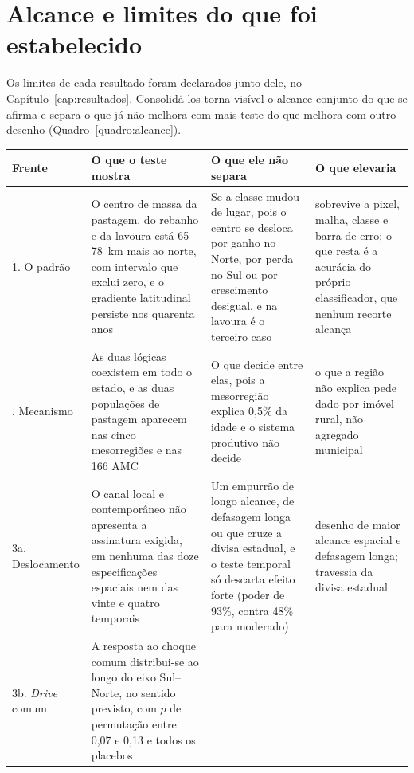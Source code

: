 \section{Alcance e limites do que foi estabelecido}
\label{sec:disc-limites}

Os limites de cada resultado foram declarados junto dele, no
Capítulo~\ref{cap:resultados}. Consolidá-los torna visível o alcance conjunto
do que se afirma e separa o que já não melhora com mais teste do que melhora
com outro desenho (Quadro~\ref{quadro:alcance}).

\begin{quadro}[htb]
\centering
\caption[O que cada frente mostra e o que não separa]{O que cada frente mostra, o que ela não separa e o que elevaria o alcance.}
\label{quadro:alcance}
\small
\begin{tabular}{p{1.9cm}p{4.2cm}p{4.0cm}p{4.0cm}}
\toprule
\textbf{Frente} & \textbf{O que o teste mostra} & \textbf{O que ele não separa} & \textbf{O que elevaria} \\
\midrule
1. O padrão &
O centro de massa da pastagem, do rebanho e da lavoura está 65--78~km mais ao
norte, com intervalo que exclui zero, e o gradiente latitudinal persiste nos
quarenta anos &
Se a classe mudou de lugar, pois o centro se desloca por ganho no Norte, por
perda no Sul ou por crescimento desigual, e na lavoura é o terceiro caso &
sobrevive a pixel, malha, classe e barra de erro; o que resta é a acurácia do
próprio classificador, que nenhum recorte alcança \\
\addlinespace
2. Mecanismo &
As duas lógicas coexistem em todo o estado, e as duas populações de pastagem
aparecem nas cinco mesorregiões e nas 166 AMC &
O que decide entre elas, pois a mesorregião explica 0,5\% da idade e o
sistema produtivo não decide &
o que a região não explica pede dado por imóvel rural, não agregado
municipal \\
\addlinespace
3a. Deslocamento &
O canal local e contemporâneo não apresenta a assinatura exigida, em nenhuma
das doze especificações espaciais nem das vinte e quatro temporais &
Um empurrão de longo alcance, de defasagem longa ou que cruze a divisa
estadual, e o teste temporal só descarta efeito forte (poder de 93\%, contra
48\% para moderado) &
desenho de maior alcance espacial e defasagem longa; travessia da divisa
estadual \\
\addlinespace
3b. \emph{Drive} comum &
A resposta ao choque comum distribui-se ao longo do eixo Sul--Norte, no
sentido previsto, com $p$ de permutação entre 0,07 e 0,13 e todos os placebos

\end{tabular}
\end{quadro}

